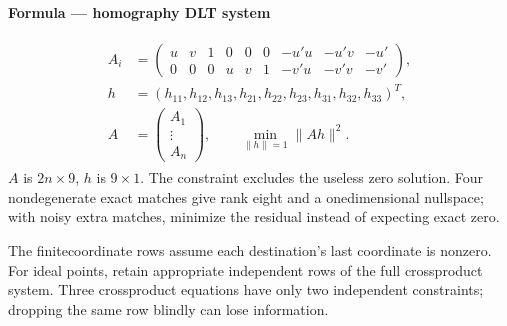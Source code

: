 \documentclass[letterpaper,11pt,english,openany,oneside]{jupyterBook}
\begin{document}
\begin{TextbookBox}
\textbf{Formula — homography DLT system}\par\smallskip
\begin{equation}\label{equation:lectures/lecture02/estimation:eq-lec02-dlt}
\begin{split}\begin{aligned}
A_i&=\begin{pmatrix}
u&v&1&0&0&0&-u'u&-u'v&-u'\\
0&0&0&u&v&1&-v'u&-v'v&-v'
\end{pmatrix},\\
h&=(h_{11},h_{12},h_{13},h_{21},h_{22},h_{23},h_{31},h_{32},h_{33})^T,\\
A&=\begin{pmatrix}A_1\\\vdots\\A_n\end{pmatrix},\qquad
\min_{\|h\|=1}\|Ah\|^2.
\end{aligned}\end{split}
\end{equation}
\sphinxAtStartPar
\(A\) is \(2n\times9\), \(h\) is \(9\times1\). The constraint excludes the useless zero solution. Four nondegenerate exact matches give rank eight and a one\sphinxhyphen{}dimensional nullspace; with noisy extra matches, minimize the residual instead of expecting exact zero.

\sphinxAtStartPar
The finite\sphinxhyphen{}coordinate rows assume each destination’s last coordinate is nonzero. For ideal points, retain appropriate independent rows of the full cross\sphinxhyphen{}product system. Three cross\sphinxhyphen{}product equations have only two independent constraints; dropping the same row blindly can lose information.

\end{TextbookBox}
\end{document}
